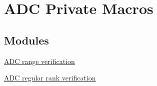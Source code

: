 \hypertarget{group___a_d_c___private___macros}{}\section{A\+DC Private Macros}
\label{group___a_d_c___private___macros}
\subsection*{Modules}
\begin{DoxyCompactItemize}
\item 
\hyperlink{group___a_d_c__range__verification}{A\+D\+C range verification}
\item 
\hyperlink{group___a_d_c__regular__rank__verification}{A\+D\+C regular rank verification}
\end{DoxyCompactItemize}
